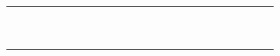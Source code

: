 \documentclass[10pt]{article}
\begin{document}
\begin{center}
\begin{tabular}{|c|c|c|c|c|c|c|c|c|c|c|c|c|c|c|c|c|c|c|c|c|c|c|c|}
\hline
 &  &  &  &  &  &  &  &  &  &  &  &  &  &  &  &  &  &  &  &  &  &  &  \\
\hline
 &  &  &  &  &  &  &  &  &  &  &  &  &  &  &  &  &  &  &  &  &  &  &  \\
\hline
 &  &  &  &  &  &  &  &  &  &  &  &  &  &  &  &  &  &  &  &  &  &  &  \\
\hline
 &  &  &  &  &  &  &  &  &  &  &  &  &  &  &  &  &  &  &  &  &  &  &  \\
\hline
 &  &  &  &  &  &  &  &  &  &  &  &  &  &  &  &  &  &  &  &  &  &  &  \\
\hline
 &  &  &  &  &  &  &  &  &  &  &  &  &  &  &  &  &  &  &  &  &  &  &  \\
\hline
 &  &  &  &  &  &  &  &  &  &  &  &  &  &  &  &  &  &  &  &  &  &  &  \\
\hline
 &  &  &  &  &  &  &  &  &  &  &  &  &  &  &  &  &  &  &  &  &  &  &  \\
\hline
 &  &  &  &  &  &  &  &  &  &  &  &  &  &  &  &  &  &  &  &  &  &  &  \\
\hline
 &  &  &  &  &  &  &  &  &  &  &  &  &  &  &  &  &  &  &  &  &  &  &  \\
\hline
 &  &  &  &  &  &  &  &  &  &  &  &  &  &  &  &  &  &  &  &  &  &  &  \\
\hline
\end{tabular}
\end{center}
\end{document}
